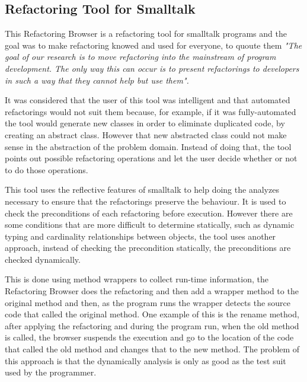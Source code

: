 
\subsection{Refactoring Tool for Smalltalk}%

This Refactoring Browser \cite{roberts1997refactoring} is a refactoring tool for smalltalk programs and the goal was to make refactoring knowed and used for everyone, to quoute them 
\textit{"The goal of our research is to move refactoring into the mainstream of program development. The only way this can occur is to present refactorings to developers in such a way that they cannot help but use them".} 


It was considered that the user of this tool was intelligent and that automated refactorings would not suit them because, for example, if it was fully-automated the tool would generate new classes in order to eliminate duplicated code, by creating an abstract class.
However that new abstracted class could not make sense in the abstraction of the problem domain. 
Instead of doing that, the tool points out possible refactoring operations and let the user decide whether or not to do those operations.

This tool uses the reflective features of smalltalk to help doing the analyzes necessary to ensure that the refactorings preserve the behaviour. 
It is used to check the preconditions of each refactoring before execution. However there are some conditions that are more difficult to determine statically, such as dynamic typing and cardinality relationships between objects, the tool uses another approach, instead of checking the precondition statically, the preconditions are checked dynamically. 

This is done using method wrappers to collect run-time information, the Refactoring Browser does the refactoring and then add a wrapper method to the original method and then, as the program runs the wrapper detects the source code that called the original method.
One example of this is the rename method, after applying the refactoring and during the program run, when the old method is called, the browser suspends the execution and go to the location of the code that called the old method and changes that to the new method. The problem of this approach is that the dynamically analysis is only as good as the test suit used by the programmer.





